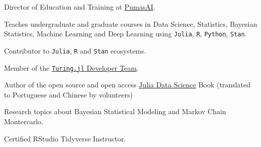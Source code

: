 \vspace{0.25cm}

\begin{cvitems}

  \item Director of Education and Training at \href{https://pumas.ai}{Pumas\-AI}.
	\item Teaches undergraduate and graduate courses in Data Science, Statistics, Bayesian Statistics,
	Machine Learning and Deep Learning using \texttt{Julia}, \texttt{R}, \texttt{Python}, \texttt{Stan}.
	\item Contributor to \texttt{Julia}, \texttt{R} and \texttt{Stan} ecosystems.
	\item Member of the \href{https://turing.ml/dev/team/}{\texttt{Turing.jl} Developer Team}.
	\item Author of the open source and open access \href{https://juliadatascience.io}{Julia Data Science} Book (translated to Portuguese and Chinese by volunteers)
	\item Research topics about Bayesian Statistical Modeling and Markov Chain Montercarlo.
	\item Certified RStudio Tidyverse Instructor.

\end{cvitems}
